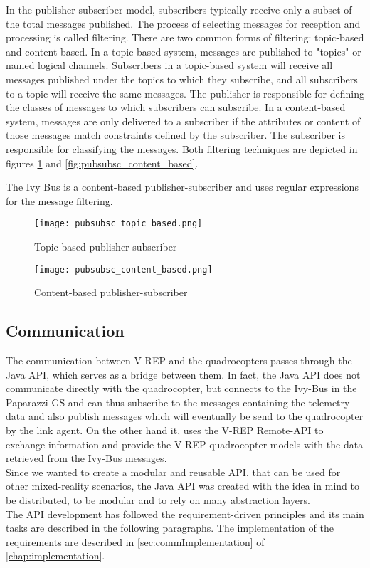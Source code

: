 In the publisher-subscriber model, subscribers typically receive only a subset of the total messages published. 
The process of selecting messages for reception and processing is called filtering. 
There are two common forms of filtering: topic-based and content-based.
In a topic-based system, messages are published to "topics" or named logical channels. 
Subscribers in a topic-based system will receive all messages published under the topics to which they subscribe, and all subscribers to a topic will receive the same messages. 
The publisher is responsible for defining the classes of messages to which subscribers can subscribe.
In a content-based system, messages are only delivered to a subscriber if the attributes or content of those messages match constraints defined by the subscriber. 
The subscriber is responsible for classifying the messages. 
Both filtering techniques are depicted in figures \ref{fig:pubsubsc_topic_based} and \ref{fig:pubsubsc_content_based}.

The Ivy Bus is a content-based publisher-subscriber and uses regular expressions for the message filtering.

\begin{figure}[!tbp]
  \centering
  \begin{minipage}[b]{0.4\textwidth}
    \texttt{[image: pubsubsc\_topic\_based.png]}
    \caption{Topic-based publisher-subscriber \label{fig:pubsubsc_content_based}}
  \end{minipage}
  \hfill
  \begin{minipage}[b]{0.4\textwidth}
    \texttt{[image: pubsubsc\_content\_based.png]}
    \caption{Content-based publisher-subscriber \label{fig:pubsubsc_topic_based}}
  \end{minipage}
\end{figure}

\subsection{Communication}
\label{sec:communication}

The communication between V-REP and the quadrocopters passes through the Java API, which serves as a bridge between them. 
In fact, the Java API does not communicate directly with the quadrocopter, but connects to the Ivy-Bus in the Paparazzi GS and can thus subscribe to the messages containing the telemetry data and also publish messages which will eventually be send to the quadrocopter by the link agent. 
On the other hand it, uses the V-REP Remote-API to exchange information and provide the V-REP quadrocopter models with the data retrieved from the Ivy-Bus messages.\\ 
Since we wanted to create a modular and reusable API, that can be used for other mixed-reality scenarios, the Java API was created with the idea in mind to be distributed, to be modular and to rely on many abstraction layers.\\ 
The API development has followed the requirement-driven principles and its main tasks are described in the following paragraphs. The implementation of the requirements are described in \ref{sec:commImplementation} of \ref{chap:implementation}.

